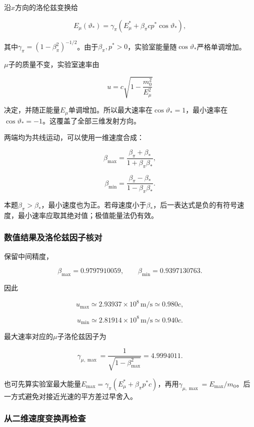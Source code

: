 \documentclass[12pt,a4paper,fontset=fandol]{ctexart}
\begin{document}
沿\(x\)方向的洛伦兹变换给

\[
\boxed{
E_\mu(\vartheta_*)
=\gamma_\pi(E_\mu^*+\beta_\pi cp^*\cos\vartheta_*)},
\]

其中\(\gamma_\pi=(1-\beta_\pi^2)^{-1/2}\)。由于\(\beta_\pi,p^*>0\)，实验室能量随\(\cos\vartheta_*\)严格单调增加。

\(\mu\)子的质量不变，实验室速率由

\[
u=c\sqrt{1-\frac{m_0^2}{E_\mu^2}}
\]

决定，并随正能量\(E_\mu\)单调增加。所以最大速率在\(\cos\vartheta_*=1\)，最小速率在\(\cos\vartheta_*=-1\)。这覆盖了全部三维发射方向。

两端均为共线运动，可以使用一维速度合成：

\[
\boxed{
\beta_{\max}=\frac{\beta_\pi+\beta_*}
{1+\beta_\pi\beta_*}},
\]

\[
\boxed{
\beta_{\min}=\frac{\beta_\pi-\beta_*}
{1-\beta_\pi\beta_*}}.
\]

本题\(\beta_\pi>\beta_*\)，最小速度也为正。若母速度小于\(\beta_*\)，后一表达式是负的有符号速度，最小速率应取其绝对值；极值能量法仍有效。

\subsubsection{数值结果及洛伦兹因子核对}\label{ux6570ux503cux7ed3ux679cux53caux6d1bux4f26ux5179ux56e0ux5b50ux6838ux5bf9}

保留中间精度，

\[
\beta_{\max}=0.9797910059,\qquad
\beta_{\min}=0.9397130763.
\]

因此

\[
\boxed{u_{\max}\simeq2.93937\times10^8\,\mathrm{m/s}
\simeq0.980c},
\]

\[
\boxed{u_{\min}\simeq2.81914\times10^8\,\mathrm{m/s}
\simeq0.940c}.
\]

最大速率对应的\(\mu\)子洛伦兹因子为

\[
\boxed{\gamma_{\mu,\max}
=\frac1{\sqrt{1-\beta_{\max}^2}}
=4.9994011}.
\]

也可先算实验室最大能量\(E_{\max}=\gamma_\pi(E_\mu^*+\beta_\pi p^*c)\)，再用\(\gamma_{\mu,\max}=E_{\max}/m_0\)。后一方式避免对接近光速的平方差过早舍入。

\subsubsection{从二维速度变换再检查}\label{ux4eceux4e8cux7ef4ux901fux5ea6ux53d8ux6362ux518dux68c0ux67e5}
\end{document}
